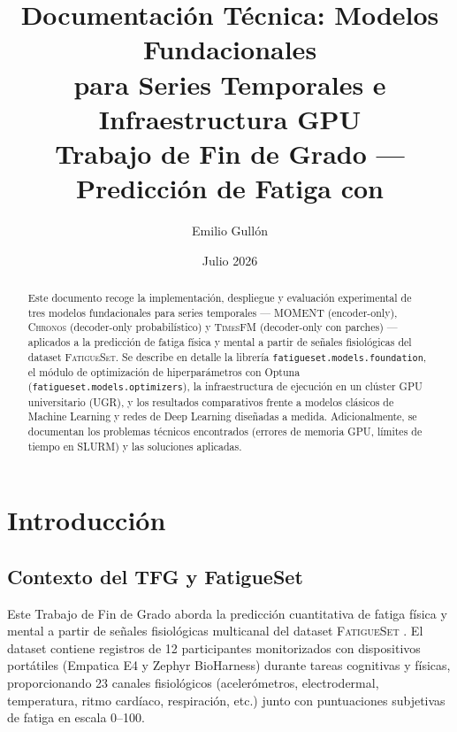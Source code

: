 \documentclass[12pt, a4paper]{article}
\title{
    \vspace{-2cm}
    \textbf{Documentación Técnica: Modelos Fundacionales\\
    para Series Temporales e Infraestructura GPU} \\[0.5em]
    \large Trabajo de Fin de Grado --- Predicción de Fatiga con \fatigueset{}
}
\author{Emilio Gullón}
\date{Julio 2026}
\newcommand{\code}[1]{\texttt{#1}}
\newcommand{\fatigueset}{\textsc{FatigueSet}}
\newcommand{\moment}{\textsc{MOMENT}}
\newcommand{\chronos}{\textsc{Chronos}}
\newcommand{\timesfm}{\textsc{TimesFM}}
\begin{document}
\maketitle

\begin{abstract}
Este documento recoge la implementación, despliegue y evaluación experimental de tres modelos fundacionales para series temporales --- \moment{} (encoder-only), \chronos{} (decoder-only probabilístico) y \timesfm{} (decoder-only con parches) --- aplicados a la predicción de fatiga física y mental a partir de señales fisiológicas del dataset \fatigueset{}. Se describe en detalle la librería \code{fatigueset.models.foundation}, el módulo de optimización de hiperparámetros con Optuna (\code{fatigueset.models.optimizers}), la infraestructura de ejecución en un clúster GPU universitario (UGR), y los resultados comparativos frente a modelos clásicos de Machine Learning y redes de Deep Learning diseñadas a medida. Adicionalmente, se documentan los problemas técnicos encontrados (errores de memoria GPU, límites de tiempo en SLURM) y las soluciones aplicadas.
\end{abstract}

\tableofcontents
\newpage

\section{Introducción}
\label{sec:introduccion}

\subsection{Contexto del TFG y FatigueSet}

Este Trabajo de Fin de Grado aborda la predicción cuantitativa de fatiga física y mental a partir de señales fisiológicas multicanal del dataset \fatigueset{} \cite{kalanadhabhatta2022fatigueset}. El dataset contiene registros de 12 participantes monitorizados con dispositivos portátiles (Empatica E4 y Zephyr BioHarness) durante tareas cognitivas y físicas, proporcionando 23 canales fisiológicos (acelerómetros, electrodermal, temperatura, ritmo cardíaco, respiración, etc.) junto con puntuaciones subjetivas de fatiga en escala 0--100.
\end{document}
